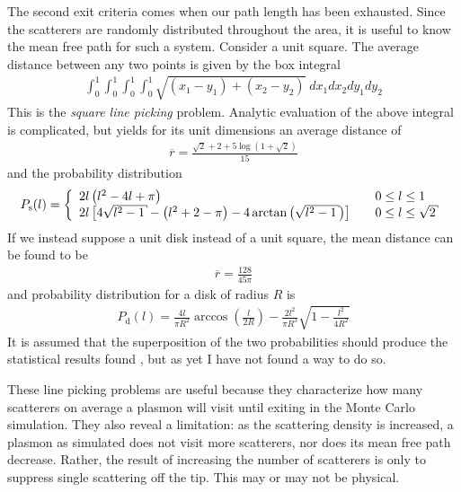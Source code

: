 The second exit criteria comes when our path length has been exhausted.
Since the scatterers are randomly distributed throughout the area, it is
useful to know the mean free path for such a system.  Consider a unit
square.  The average distance between any two points is given by the box
integral
\begin{align}
\int_0^1 \int_0^1 \int_0^1 \int_0^1 \sqrt{(x_1-y_1)+(x_2-y_2)}\; dx_1 dx_2 dy_1 dy_2
\end{align}
This is the {\it square line picking} problem.  Analytic evaluation of the
above integral is complicated, but yields for its unit dimensions an
average distance of
\begin{align}
\overline{r} = \frac{\sqrt{2}+2+5\log\left(1+\sqrt{2}\right)}{15}
\end{align}
and the probability distribution
\begin{align}
P_\mathrm{s}(l) = \left\{
\begin{array}{l l}
2l\left(l^2 -4l + \pi\right) & \quad  0\leq l \leq 1\\
2l\left[4\sqrt{l^2-1}-\left(l^2+2-\pi\right)-4\arctan\left({\sqrt{l^2-1}}\right)\right]
& \quad 0 \leq l \leq \sqrt{2}\\
\end{array}
\right.
\end{align}
If we instead suppose a unit disk instead of a unit square, the mean
distance can be found to be
\begin{align}
\overline{r}= \frac{128}{45 \pi}
\end{align}
and probability distribution for a disk of radius $R$ is
\begin{align}
P_\mathrm{d}(l)=\frac{4l}{\pi R^2} \arccos\left(\frac{l}{2R}\right) - \frac{2
l^2}{\pi R^3} \sqrt{1-\frac{l^2}{4 R^2}}
\end{align}
It is assumed that the superposition of the two probabilities should
produce the statistical results found , but as yet
I have not found a way to do so.

These line picking problems are useful because they characterize how many
scatterers on average a plasmon will visit until exiting in the Monte Carlo
simulation.  They also reveal a limitation: as the scattering density is
increased, a plasmon as simulated does not visit more scatterers, nor does
its mean free path decrease.  Rather, the result of increasing the number
of scatterers is only to suppress single scattering off the tip.  This may
or may not be physical. 
